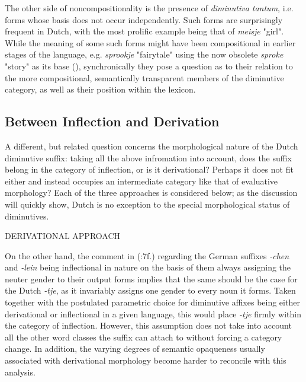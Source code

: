The other side of noncompositionality is the presence of \textit{diminutiva tantum}, i.e. forms whose basis does not occur independently. Such forms are surprisingly frequent in Dutch, with the most prolific example being that of \textit{meisje} "girl". While the meaning of some such forms might have been compositional in earlier stages of the language, e.g. \textit{sprookje} "fairytale" using the now obsolete \textit{sproke} "story" as its base (\cite{taalportaal}), synchronically they pose a question as to their relation to the more compositional, semantically transparent members of the diminutive category, as well as their position within the lexicon.

\subsection{Between Inflection and Derivation}
A different, but related question concerns the morphological nature of the Dutch diminutive suffix: taking all the above infromation into account, does the suffix belong in the category of inflection, or is it derivational? Perhaps it does not fit either and instead occupies an intermediate category like that of evaluative morphology? Each of the three approaches is considered below; as the discussion will quickly show, Dutch is no exception to the special morphological status of diminutives.

DERIVATIONAL APPROACH

On the other hand, the comment in \citeauthor{Schneider+2003} (\citeyear{Schneider+2003}:7f.) regarding the German suffixes \textit{-chen} and \textit{-lein} being inflectional in nature on the basis of them always assigning the neuter gender to their output forms implies that the same should be the case for the Dutch \textit{-tje}, as it invariably assigns one gender to every noun it forms. Taken together with the postulated parametric choice for diminutive affixes being either derivational or inflectional in a given language, this would place \textit{-tje} firmly within the category of inflection. However, this assumption does not take into account all the other word classes the suffix can attach to without forcing a category change. In addition, the varying degrees of semantic opaqueness usually associated with derivational morphology become harder to reconcile with this analysis. 

